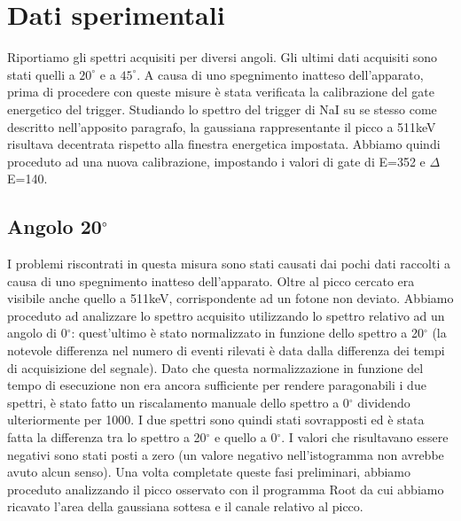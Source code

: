\documentclass[italian,11pt]{report}
\begin{document}
\newpage
\section{Dati sperimentali}
Riportiamo gli spettri acquisiti per diversi angoli. 
Gli ultimi dati acquisiti sono stati quelli a $20^\circ$ e a $45^\circ$. A causa di uno spegnimento inatteso dell'apparato, prima di procedere con queste misure è stata verificata la calibrazione del gate energetico del trigger. Studiando lo spettro del trigger di NaI su se stesso come descritto nell'apposito paragrafo, la gaussiana rappresentante il picco a 511keV risultava decentrata rispetto alla finestra energetica impostata. Abbiamo quindi proceduto ad una nuova calibrazione, impostando i valori di gate di E=352 e $\Delta$E=140.
\vspace{1cm}

\subsection{Angolo 20$^\circ$}
I problemi riscontrati in questa misura sono stati causati dai pochi dati raccolti a causa di uno spegnimento inatteso dell'apparato. Oltre al picco cercato era visibile anche quello a 511keV, corrispondente ad un fotone non deviato. Abbiamo proceduto ad analizzare lo spettro acquisito utilizzando lo spettro relativo ad un angolo di 0$^\circ$: quest'ultimo è stato normalizzato in funzione dello spettro a 20$^\circ$ (la notevole differenza nel numero di eventi rilevati è data dalla differenza dei tempi di acquisizione del segnale). Dato che questa normalizzazione in funzione del tempo di esecuzione non era ancora sufficiente per rendere paragonabili i due spettri, è stato fatto un riscalamento manuale dello spettro a 0$^\circ$ dividendo ulteriormente per 1000. I due spettri sono quindi stati sovrapposti ed è stata fatta la differenza tra lo spettro a 20$^\circ$ e quello a 0$^\circ$. I valori che risultavano essere negativi sono stati posti a zero (un valore negativo nell'istogramma non avrebbe avuto alcun senso). Una volta completate queste fasi preliminari, abbiamo proceduto analizzando il picco osservato con il programma Root da cui abbiamo ricavato l'area della gaussiana sottesa e il canale relativo al picco.
\end{document}
